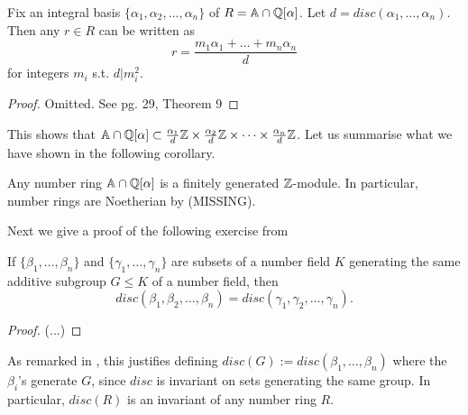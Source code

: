 \begin{prop}\label{number-ring-contained-in-free-abelian-group}
Fix an integral basis $\{\alpha_1,\alpha_2,\dots,\alpha_n\}$ of $R=\mathbb{A}\cap\mathbb{Q}[\alpha]$. Let $d=disc(\alpha_1,\dots,\alpha_n)$. Then any $r\in R$ can be written as
$$r=\frac{m_1\alpha_1+\dots+m_n\alpha_n}{d}$$ for integers $m_i$ s.t. $d|m_i^2$.
\end{prop}
\begin{proof}
Omitted. See \cite{NumberFields} pg. 29, Theorem 9
\end{proof}
This shows that $\mathbb{A}\cap\mathbb{Q}[\alpha]\subset \frac{\alpha_1}{d}\mathbb{Z}\times \frac{\alpha_2}{d}\mathbb{Z}\times \dots \times \frac{\alpha_n}{d}\mathbb{Z}$. Let us summarise what we have shown in the following corollary.
\begin{corollary}\label{number-rings-are-Noetherian}
Any number ring $\mathbb{A}\cap\mathbb{Q}[\alpha]$ is a finitely generated $\mathbb{Z}$-module. In particular, number rings are Noetherian by (MISSING).
\end{corollary}

Next we give a proof of the following exercise from \cite{NumberFields}

\begin{prop}\label{disc-invariant-on-generating-sets}
If $\{\beta_1,\dots,\beta_n\}$ and $\{\gamma_1,\dots,\gamma_n\}$ are subsets of a number field $K$ generating the same additive subgroup $G\leq K$ of a number field, then $$disc(\beta_1,\beta_2,\dots,\beta_n)=disc(\gamma_1,\gamma_2,\dots,\gamma_n).$$
\end{prop}
\begin{proof}
(...)
\end{proof}
As remarked in \cite{NumberFields}, this justifies defining $disc(G):=disc(\beta_1,\dots,\beta_n)$ where the $\beta_i$'s generate $G$, since $disc$ is invariant on sets generating the same group. In particular, $disc(R)$ is an invariant of any number ring $R$.


